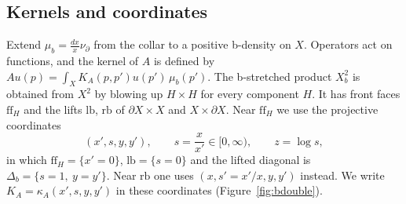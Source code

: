 \documentclass[11pt,oneside,reqno]{article}
\theoremstyle{plain}
\theoremstyle{definition}
\theoremstyle{remark}
\begin{document}
\subsection{Kernels and coordinates}
Extend \(\mu_b=\frac{dx}{x}\nu_\partial\) from the collar to a positive
b-density on \(X\). Operators act on functions, and the kernel of \(A\) is
defined by \(Au(p)=\int_XK_A(p,p')u(p')\,\mu_b(p')\). The b-stretched
product \(X_b^2\) is obtained from \(X^2\) by blowing up \(H\times H\) for
every component \(H\). It has front faces \(\mathrm{ff}_H\) and the lifts
\(\mathrm{lb}\), \(\mathrm{rb}\) of \(\partial X\times X\) and
\(X\times\partial X\). Near \(\mathrm{ff}_H\) we use the projective
coordinates
\begin{equation}\label{eq:proj}
 (x',s,y,y'),\qquad s=\frac{x}{x'}\in[0,\infty),\qquad z=\log s,
\end{equation}
in which \(\mathrm{ff}_H=\{x'=0\}\), \(\mathrm{lb}=\{s=0\}\) and the lifted
diagonal is \(\Delta_b=\{s=1,\ y=y'\}\). Near \(\mathrm{rb}\) one uses
\((x,s'=x'/x,y,y')\) instead. We write
\(K_A=\kappa_A(x',s,y,y')\) in these coordinates
(Figure~\ref{fig:bdouble}).
\end{document}
